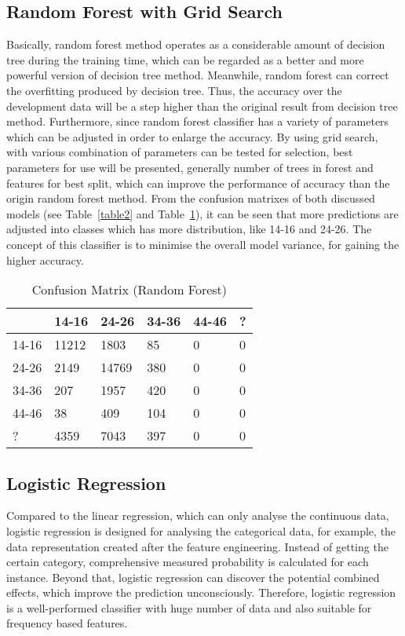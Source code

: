 \documentclass[11pt]{article}
\begin{document}
\subsection{Random Forest with Grid Search}
Basically, random forest method operates as a considerable amount of decision tree during the training time, which can be regarded as a better and more powerful version of decision tree method. Meanwhile, random forest can correct the overfitting produced by decision tree. Thus, the accuracy over the development data will be a step higher than the original result from decision tree method.
Furthermore, since random forest classifier has a variety of parameters which can be adjusted in order to enlarge the accuracy. By using grid search, with various combination of parameters can be tested for selection, best parameters for use will be presented, generally number of trees in forest and features for best split, which can improve the performance of accuracy than the origin random forest method.
From the confusion matrixes of both discussed models (see Table~\ref{table2} and Table~\ref{table3}), it can be seen that more predictions are adjusted into classes which has more distribution, like 14-16 and 24-26. The concept of this classifier is to minimise the overall model variance, for gaining the higher accuracy.

\begin{table}[h]
\centering
\begin{tabular}{|l|l|l|l|l|l|}
\hline
      & 14-16 & 24-26 & 34-36 & 44-46 & ? \\ \hline
14-16 & 11212 & 1803  & 85    & 0     & 0 \\ \hline
24-26 & 2149  & 14769 & 380   & 0     & 0 \\ \hline
34-36 & 207   & 1957  & 420   & 0     & 0 \\ \hline
44-46 & 38    & 409   & 104   & 0     & 0 \\ \hline
?     & 4359  & 7043  & 397   & 0     & 0 \\ \hline
\end{tabular}
\caption{Confusion Matrix (Random Forest)}
\label{table3}
\end{table}

\subsection{Logistic Regression}

Compared to the linear regression, which can only analyse the continuous data, logistic regression is designed for analysing the categorical data, for example, the data representation created after the feature engineering. Instead of getting the certain category, comprehensive measured probability is calculated for each instance. Beyond that, logistic regression can discover the potential combined effects, which improve the prediction unconsciously. Therefore, logistic regression is a well-performed classifier with huge number of data and also suitable for frequency based features.
\end{document}

